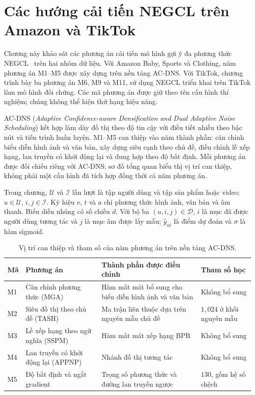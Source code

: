 \section{Các hướng cải tiến NEGCL trên Amazon và TikTok}
\label{chap:negcl_advanced_acd_dns}

Chương này khảo sát các phương án cải tiến mô hình gợi ý đa phương thức NEGCL~\cite{shi2025negcl} trên hai nhóm dữ liệu. Với Amazon Baby, Sports và Clothing, năm phương án M1--M5 được xây dựng trên nền tảng AC-DNS. Với TikTok, chương trình bày ba phương án M6, M9 và M11, sử dụng NEGCL triển khai trên TikTok làm mô hình đối chứng. Các mã phương án được giữ theo tên cấu hình thí nghiệm; chúng không thể hiện thứ hạng hiệu năng.

AC-DNS (\textit{Adaptive Confidence-aware Densification and Dual Adaptive Noise Scheduling}) kết hợp làm dày đồ thị theo độ tin cậy với điều tiết nhiễu theo bậc nút và tiến trình huấn luyện. M1--M5 can thiệp vào năm thành phần: căn chỉnh biểu diễn hình ảnh và văn bản, xây dựng siêu cạnh theo chủ đề, điều chỉnh lề xếp hạng, lan truyền có khởi động lại và dung hợp theo độ bất định. Mỗi phương án được đối chiếu riêng với AC-DNS; sơ đồ tổng quan biểu thị vị trí can thiệp, không phải một cấu hình đã tích hợp đồng thời cả năm phương án.

Trong chương, $\mathcal{U}$ và $\mathcal{I}$ lần lượt là tập người dùng và tập sản phẩm hoặc video; $u\in\mathcal{U}$, $i,j\in\mathcal{I}$. Ký hiệu $v$, $t$ và $a$ chỉ phương thức hình ảnh, văn bản và âm thanh. Biểu diễn nhúng có số chiều $d$. Với bộ ba $(u,i,j)\in\mathcal{D}$, $i$ là mục đã được người dùng tương tác và $j$ là mục âm được lấy mẫu; $\hat y_{ui}$ là điểm dự đoán và $\sigma$ là hàm sigmoid.

\begin{table}[H]
\centering
\renewcommand{\baselinestretch}{1}
\small
\setlength{\tabcolsep}{4pt}

\caption{Vị trí can thiệp và tham số của năm phương án trên nền tảng AC-DNS.}
\label{tab:negcl_m1_m5_overview}
\begin{tabular}{@{}
    >{\centering\arraybackslash}p{0.8cm}
    >{\raggedright\arraybackslash}p{3.0cm}
    >{\raggedright\arraybackslash}p{\dimexpr\linewidth-7cm-6\tabcolsep\relax}
    >{\raggedright\arraybackslash}p{3.2cm}@{}}
\toprule
\textbf{Mã} & \textbf{Phương án} & \textbf{Thành phần được điều chỉnh} & \textbf{Tham số học} \\
\midrule
M1 & Căn chỉnh phương thức (MGA) & Hàm mất mát bổ sung cho biểu diễn hình ảnh và văn bản & Không bổ sung \\
M2 & Siêu đồ thị theo chủ đề (TASH) & Ma trận liên thuộc dựa trên nguyên mẫu chủ đề & $1{,}024$ ở khối nguyên mẫu \\
M3 & Lề xếp hạng theo ngữ nghĩa (SSPM) & Hàm mất mát xếp hạng BPR & Không bổ sung \\
M4 & Lan truyền có khởi động lại (APPNP) & Nhánh đồ thị tương tác & Không bổ sung \\
M5 & Độ bất định và ngắt gradient & Trọng số phương thức và đường lan truyền ngược & $130$, gồm hệ số chệch \\
\bottomrule
\end{tabular}
\end{table}

